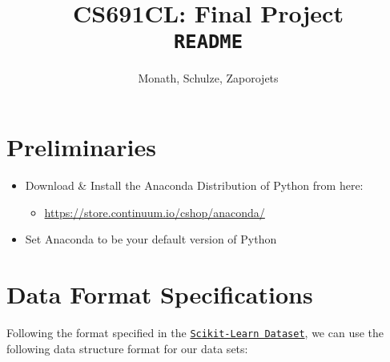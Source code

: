 \documentclass[12pt]{article}
\begin{document}

\lstset{escapechar=@,style=custompython}
\author{Monath, Schulze, Zaporojets}
  \title{CS691CL: Final Project \\  {\tt README}}
  \maketitle
  \newcommand{\lst}[1]{\begin{lstlisting} #1 \end{lstlisting}} 
  
  \clearpage
  
  \section{Preliminaries}
  \begin{itemize}
  \item Download \& Install the Anaconda Distribution of Python from here: 
  \begin{itemize}
  \item \href{https://store.continuum.io/cshop/anaconda/}{https://store.continuum.io/cshop/anaconda/}
  \end{itemize}
  \item Set Anaconda to be your default version of Python
  \end{itemize}
  
  \section{Data Format Specifications}
  
  Following the format specified in the \href{http://scikit-learn.org/stable/datasets/}{\tt Scikit-Learn Dataset}, we can use the following data structure format for our data sets:
  
\end{document}

